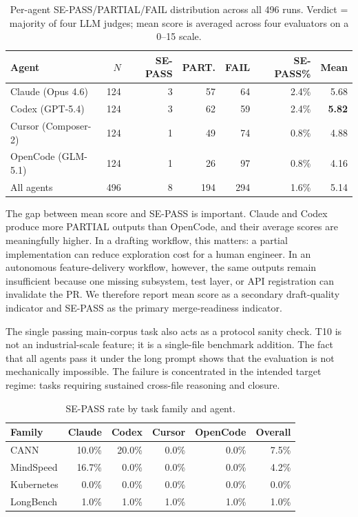 \begin{table}[t]
\caption{Per-agent SE-PASS/PARTIAL/FAIL distribution across all 496 runs. Verdict = majority of four LLM judges; mean score is averaged across four evaluators on a 0--15 scale.}
\label{tab:config-pass}
\centering
\small
\begin{tabular*}{\textwidth}{@{\extracolsep{\fill}}lrrrrrr@{}}
\toprule
\textbf{Agent} & $N$ & \textbf{SE-PASS} & \textbf{PART.} & \textbf{FAIL} & \textbf{SE-PASS\%} & \textbf{Mean} \\
\midrule
Claude (Opus 4.6)     & 124 & 3 & 57 & 64 & 2.4\% & 5.68 \\
Codex (GPT-5.4)       & 124 & 3 & 62 & 59 & 2.4\% & \textbf{5.82} \\
Cursor (Composer-2)   & 124 & 1 & 49 & 74 & 0.8\% & 4.88 \\
OpenCode (GLM-5.1)    & 124 & 1 & 26 & 97 & 0.8\% & 4.16 \\
\midrule
All agents           & 496 & 8 & 194 & 294 & 1.6\% & 5.14 \\
\bottomrule
\end{tabular*}
\end{table}

The gap between mean score and SE-PASS is important. Claude and Codex produce more PARTIAL outputs than OpenCode, and their average scores are meaningfully higher. In a drafting workflow, this matters: a partial implementation can reduce exploration cost for a human engineer. In an autonomous feature-delivery workflow, however, the same outputs remain insufficient because one missing subsystem, test layer, or API registration can invalidate the PR. We therefore report mean score as a secondary draft-quality indicator and SE-PASS as the primary merge-readiness indicator.

The single passing main-corpus task also acts as a protocol sanity check. T10 is not an industrial-scale feature; it is a single-file benchmark addition. The fact that all agents pass it under the long prompt shows that the evaluation is not mechanically impossible. The failure is concentrated in the intended target regime: tasks requiring sustained cross-file reasoning and closure.

\begin{table}[t]
\caption{SE-PASS rate by task family and agent.}
\label{tab:result-diagnostics-family}
\centering
\small
\begin{tabular*}{\columnwidth}{@{\extracolsep{\fill}}lrrrrr@{}}
\toprule
\textbf{Family} & \textbf{Claude} & \textbf{Codex} & \textbf{Cursor} & \textbf{OpenCode} & \textbf{Overall} \\
\midrule
CANN & 10.0\% & 20.0\% & 0.0\% & 0.0\% & 7.5\% \\
MindSpeed                & 16.7\% & 0.0\%  & 0.0\% & 0.0\% & 4.2\% \\
Kubernetes               & 0.0\%  & 0.0\%  & 0.0\% & 0.0\% & 0.0\% \\
LongBench                & 1.0\%  & 1.0\%  & 1.0\% & 1.0\% & 1.0\% \\
\bottomrule
\end{tabular*}
\end{table}

